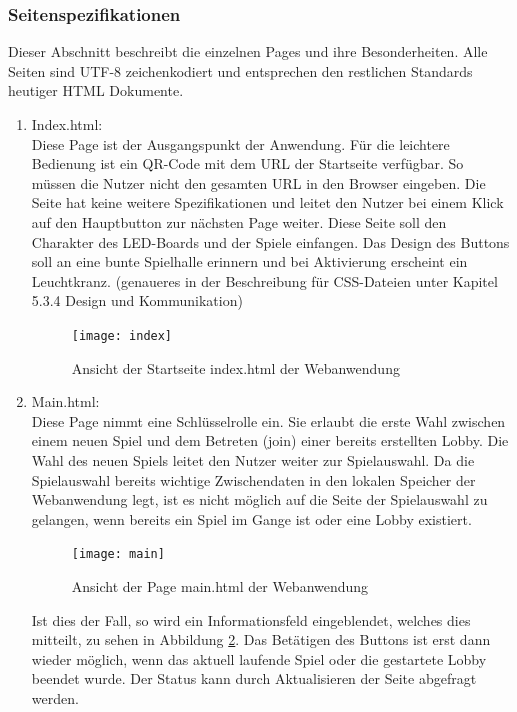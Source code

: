 \documentclass[12pt,a4paper]{article}
\begin{document}
\subsubsection{Seitenspezifikationen}
Dieser Abschnitt beschreibt die einzelnen Pages und ihre Besonderheiten. Alle Seiten sind UTF-8 zeichenkodiert und entsprechen den restlichen Standards heutiger HTML Dokumente. 
\vspace{1.5ex}\\

\begin{enumerate}
\item{Index.html:}\\
Diese Page ist der Ausgangspunkt der Anwendung. Für die leichtere Bedienung ist ein QR-Code mit dem URL der Startseite verfügbar. So müssen die Nutzer nicht den gesamten URL in den Browser eingeben. 
Die Seite hat keine weitere Spezifikationen und leitet den Nutzer bei einem Klick auf den Hauptbutton zur nächsten Page weiter. Diese Seite soll den Charakter des LED-Boards und der Spiele einfangen. Das Design des Buttons soll an eine bunte Spielhalle erinnern und bei Aktivierung erscheint ein Leuchtkranz. (genaueres in der Beschreibung für CSS-Dateien unter Kapitel 5.3.4 \glqq Design und Kommunikation\grqq)

	\begin{figure}[h]
	\centering
	\texttt{[image: index]}
	\caption{\label{fig:index}Ansicht der Startseite \glqq index.html\grqq{} der Webanwendung}
	\end{figure}

\item{Main.html:}\\
Diese Page nimmt eine Schlüsselrolle ein. Sie erlaubt die erste Wahl zwischen einem neuen Spiel und dem Betreten (\glqq join\grqq{}) einer bereits erstellten Lobby. Die Wahl des neuen Spiels leitet den Nutzer weiter zur Spielauswahl. Da die Spielauswahl bereits wichtige Zwischendaten in den lokalen Speicher der Webanwendung legt, ist es nicht möglich auf die Seite der Spielauswahl zu gelangen, wenn bereits ein Spiel im Gange ist oder eine Lobby existiert. 

	\begin{figure}[h]
	\centering
	\texttt{[image: main]}
	\caption{\label{fig:main}Ansicht der Page \glqq main.html\grqq{} der Webanwendung}
	\end{figure}
	
Ist dies der Fall, so wird ein Informationsfeld eingeblendet, welches dies mitteilt, zu sehen in Abbildung \ref{fig:main}. Das Betätigen des Buttons ist erst dann wieder möglich, wenn das aktuell laufende Spiel oder die gestartete Lobby beendet wurde. Der Status kann durch Aktualisieren der Seite abgefragt werden. 


\end{enumerate}
\end{document}
